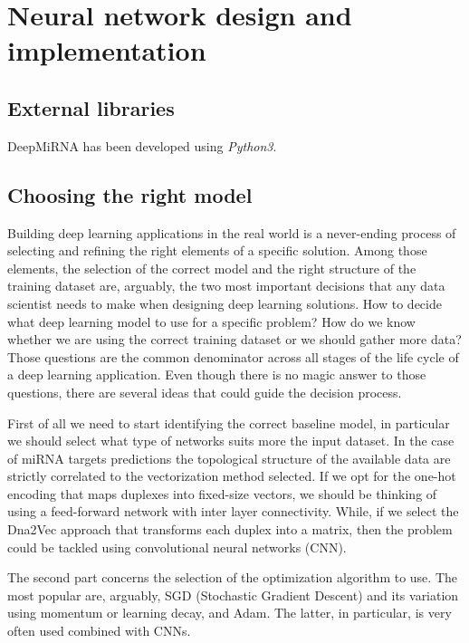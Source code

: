 
\chapter{Neural network design and implementation} %

\label{Chapter4} %

\section{External libraries}
DeepMiRNA has been developed using \emph{Python3}.

\section{Choosing the right model}
Building deep learning applications in the real world is a never-ending process of selecting and refining the right elements of a specific solution. Among those elements, the selection of the correct model and the right structure of the training dataset are, arguably, the two most important decisions that any data scientist needs to make when designing deep learning solutions. How to decide what deep learning model to use for a specific problem? How do we know whether we are using the correct training dataset or we should gather more data? Those questions are the common denominator across all stages of the life cycle of a deep learning application. Even though there is no magic answer to those questions, there are several ideas that could guide the decision process. 

First of all we need to start identifying the correct baseline model, in particular we should select what type of networks suits more the input dataset. In the case of miRNA targets predictions the topological structure of the available data are strictly correlated to the vectorization method selected. If we opt for the one-hot encoding that maps duplexes into fixed-size vectors, we should be thinking of using a feed-forward network with inter layer connectivity. While, if we select the Dna2Vec approach that transforms each duplex into a matrix, then the problem could be tackled using convolutional neural networks (CNN)\cite{dl}.  

The second part concerns the selection of the optimization algorithm to use. The most popular are, arguably, SGD (Stochastic Gradient Descent) and its variation using momentum or learning decay, and Adam. The latter, in particular, is very often used combined with CNNs.

